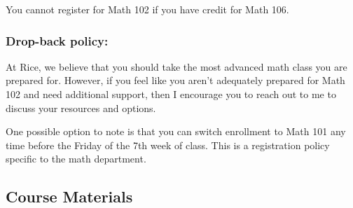 \documentclass[11pt]{article}
\begin{document}
You cannot register for Math 102 if you have credit for Math 106.

\subsubsection*{Drop-back policy:}  

At Rice, we believe that you should take the most advanced math class you are prepared for. However, if you feel like you aren't adequately prepared for Math 102 and need additional support, then I encourage you to reach out to me to discuss your resources and options.

One possible option to note is that you can switch enrollment to Math 101 any time before the Friday of the 7th week of class. This is a registration policy specific to the math department.  


\subsection{Course Materials}
\end{document}
